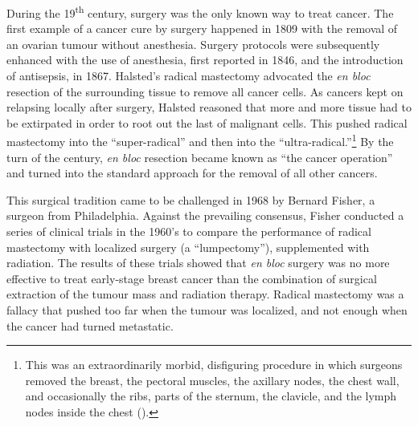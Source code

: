 During the 19\textsuperscript{th} century, surgery was the only known way to
treat cancer.  The first example of a cancer cure by surgery happened in 1809
with the removal of an ovarian tumour without anesthesia.  Surgery protocols
were subsequently enhanced with the use of anesthesia, first reported in
1846,\cite{warren_inhalation_1846} and the introduction of antisepsis, in
1867.\cite{lister_antiseptic_1867} Halsted's radical mastectomy advocated the
\emph{en bloc} resection of the surrounding tissue to remove all cancer cells.
As cancers kept on relapsing locally after surgery, Halsted reasoned that more
and more tissue had to be extirpated in order to root out the last of malignant
cells.  This pushed radical mastectomy into the ``super-radical'' and then into
the ``\mbox{ultra-radical}.''\footnote{This was an extraordinarily morbid,
  disfiguring procedure in which surgeons removed the breast, the pectoral
  muscles, the axillary nodes, the chest wall, and occasionally the ribs, parts
  of the sternum, the clavicle, and the lymph nodes inside the chest
  (\citealp{mukherjee_emperor_2011}).}  By the turn of the century, \emph{en
  bloc} resection became known as ``the cancer operation'' and turned into the
standard approach for the removal of all other cancers.

This surgical tradition came to be challenged in 1968 by Bernard Fisher, a
surgeon from Philadelphia.  Against the prevailing consensus, Fisher conducted a
series of clinical trials in the 1960's to compare the performance of radical
mastectomy with localized surgery (a ``lumpectomy''), supplemented with
radiation.  The results of these trials showed that \emph{en bloc} surgery was
no more effective to treat early-stage breast cancer than the combination of
surgical extraction of the tumour mass and radiation
therapy.\cite{fisher_five-year_1985,fisher_ten-year_1985} Radical mastectomy was
a fallacy that pushed too far when the tumour was localized, and not enough when
the cancer had turned metastatic.


